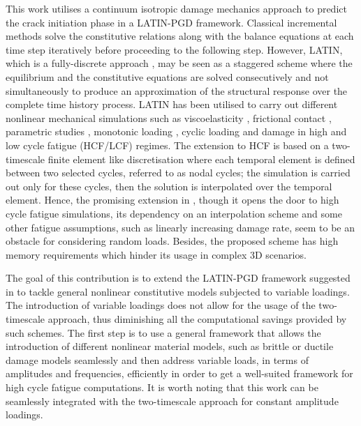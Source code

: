 This work utilises a continuum isotropic damage mechanics approach to predict the crack initiation phase in a LATIN-PGD framework. Classical incremental methods solve the constitutive relations along with the balance equations at each time step iteratively before proceeding to the following step. However, LATIN, which is a fully-discrete approach \parencite{Glas2017}, may be seen as a staggered scheme where the equilibrium and the constitutive equations are solved consecutively and not simultaneously to produce an approximation of the structural response over the complete time history process. LATIN has been utilised to carry out different nonlinear mechanical simulations such as viscoelasticity \parencite{Relun2013}, frictional contact \parencite{giacoma:tel-01071406}, parametric studies \parencite{Heyberger2012},
monotonic loading \parencite{allix1989damage}, cyclic loading \parencite{bha2017} and damage \parencite{bha2018temporal,bhattacharyya2018model,bhattacharyya2019kinetic} in high and low cycle fatigue (HCF/LCF) regimes. The extension to HCF is based on a two-timescale finite element like discretisation where each temporal element is defined between two selected cycles, referred to as nodal cycles; the simulation is carried out only for these cycles, then the solution is interpolated over the temporal element. Hence, the promising extension in \parencite{bhattacharyya2018model}, though it opens the door to high cycle fatigue simulations, its dependency on an interpolation scheme and some other fatigue assumptions, such as linearly increasing damage rate, seem to be an obstacle for considering random loads. Besides, the proposed scheme has high memory requirements which hinder its usage in complex 3D scenarios.

The goal of this contribution is to extend the LATIN-PGD framework suggested in \parencite{bhattacharyya2018model} to tackle general nonlinear constitutive models subjected to variable loadings. The introduction of variable loadings does not allow for the usage of the two-timescale approach, thus diminishing all the computational savings provided by such schemes. The first step is to use a general framework that allows the introduction of different nonlinear material models, such as brittle or ductile damage models seamlessly and then address variable loads, in terms of amplitudes and frequencies, efficiently in order to get a well-suited framework for high cycle fatigue computations. It is worth noting that this work can be seamlessly integrated with the two-timescale approach for constant amplitude loadings.

